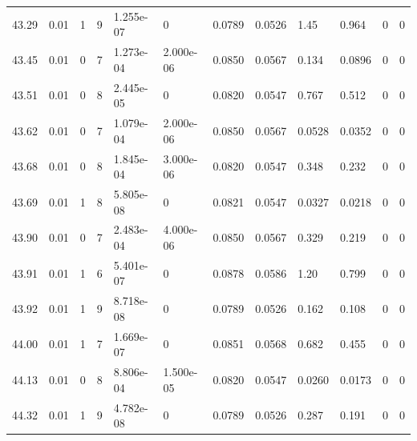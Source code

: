 \documentclass[preview]{standalone}
\begin{document}
{{{{{{{{{{{\begin{tabular}{L{1.2cm}C{1.2cm} C{0.3cm}C{0.5cm} C{1.4cm}C{1.4cm} C{1.4cm}C{1.4cm} C{1.6cm}C{1.6cm} C{1.6cm}C{1.6cm}}
  43.29  &  0.01  & 1     &  9 &  1.255e-07  & 0  &  0.0789&   0.0526& 1.45 & 0.964   &  0 & 0  \\ 
  43.45  &  0.01  & 0     &  7 &  1.273e-04  & 2.000e-06  &  0.0850&   0.0567& 0.134 & 0.0896   &  0 & 0  \\ 
  43.51  &  0.01  & 0     &  8 &  2.445e-05  & 0  &  0.0820&   0.0547& 0.767 & 0.512   &  0 & 0  \\ 
  43.62  &  0.01  & 0     &  7 &  1.079e-04  & 2.000e-06  &  0.0850&   0.0567& 0.0528 & 0.0352   &  0 & 0  \\ 
  43.68  &  0.01  & 0     &  8 &  1.845e-04  & 3.000e-06  &  0.0820&   0.0547& 0.348 & 0.232   &  0 & 0  \\ 
  43.69  &  0.01  & 1     &  8 &  5.805e-08  & 0  &  0.0821&   0.0547& 0.0327 & 0.0218   &  0 & 0  \\ 
  43.90  &  0.01  & 0     &  7 &  2.483e-04  & 4.000e-06  &  0.0850&   0.0567& 0.329 & 0.219   &  0 & 0  \\ 
  43.91  &  0.01  & 1     &  6 &  5.401e-07  & 0  &  0.0878&   0.0586& 1.20 & 0.799   &  0 & 0  \\ 
  43.92  &  0.01  & 1     &  9 &  8.718e-08  & 0  &  0.0789&   0.0526& 0.162 & 0.108   &  0 & 0  \\ 
  44.00  &  0.01  & 1     &  7 &  1.669e-07  & 0  &  0.0851&   0.0568& 0.682 & 0.455   &  0 & 0  \\ 
  44.13  &  0.01  & 0     &  8 &  8.806e-04  & 1.500e-05  &  0.0820&   0.0547& 0.0260 & 0.0173   &  0 & 0  \\ 
  44.32  &  0.01  & 1     &  9 &  4.782e-08  & 0  &  0.0789&   0.0526& 0.287 & 0.191   &  0 & 0  \\ 
\hline 
\end{tabular} 

}}}}}}}}}}}
\end{document}
